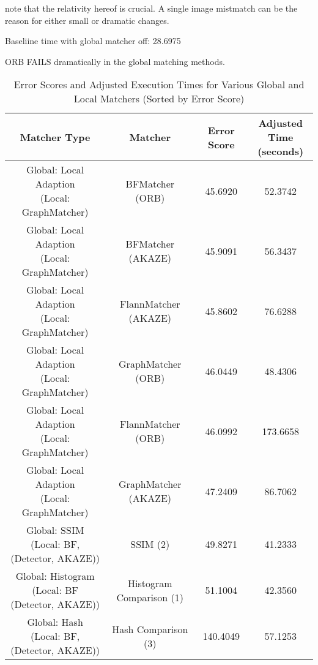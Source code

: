note that the relativity hereof is crucial. A single image mistmatch can be the reason for either small or dramatic changes. 

Baseliine time with global matcher off: 28.6975
    

ORB FAILS dramatically in the global matching methods. 


\begin{table}[H]
    \centering
    \small  %
    \setlength{\tabcolsep}{4pt}  %
    \renewcommand{\arraystretch}{1.2}  %
    \begin{tabular}{|c|c|c|c|}
    \hline
    \textbf{Matcher Type} & \textbf{Matcher} & \textbf{Error Score} & \makecell{\textbf{Adjusted} \\ \textbf{Time (seconds)}} \\ \hline
    \makecell{Global: Local Adaption  \\ (Local: GraphMatcher)} & BFMatcher (ORB) & 45.6920 & 52.3742 \\ \hline
    \makecell{Global: Local Adaption \\ (Local: GraphMatcher)} & BFMatcher (AKAZE) & 45.9091 & 56.3437 \\ \hline
    \makecell{Global: Local Adaption  \\ (Local: GraphMatcher)} & FlannMatcher (AKAZE) & 45.8602 & 76.6288 \\ \hline
    \makecell{Global: Local Adaption \\ (Local: GraphMatcher)} & GraphMatcher (ORB) & 46.0449 & 48.4306 \\ \hline
    \makecell{Global: Local Adaption \\ (Local: GraphMatcher)} & FlannMatcher (ORB) & 46.0992 & 173.6658 \\ \hline
    \makecell{Global: Local Adaption \\ (Local: GraphMatcher)} & GraphMatcher (AKAZE) & 47.2409 & 86.7062 \\ \hline
    \makecell{Global: SSIM \\ (Local: BF, (Detector, AKAZE))} & SSIM (2) & 49.8271 & 41.2333 \\ \hline
    \makecell{Global: Histogram \\ (Local: BF (Detector, AKAZE))} & Histogram Comparison (1) & 51.1004 & 42.3560 \\ \hline
    \makecell{Global: Hash \\ (Local: BF, (Detector, AKAZE))} & Hash Comparison (3) & 140.4049 & 57.1253 \\ \hline
    \end{tabular}
    \caption{Error Scores and Adjusted Execution Times for Various Global and Local Matchers (Sorted by Error Score)}
\end{table}


